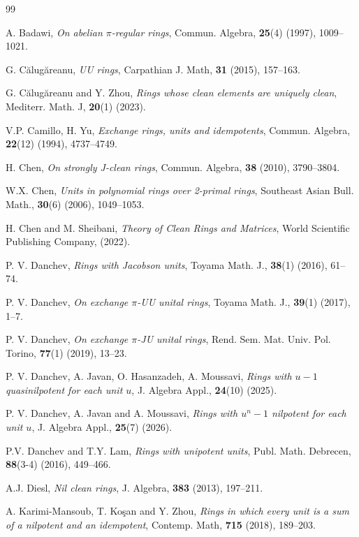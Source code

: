 \documentclass[12pt]{amsart}
\theoremstyle{definition}
\begin{document}
\begin{thebibliography}{99}
	
A. Badawi, {\it On abelian $\pi$-regular rings}, Commun. Algebra, {\bf 25}(4) (1997), 1009--1021.

G. Călugăreanu, {\it UU rings}, Carpathian J. Math, {\bf 31} (2015), 157--163.

G. Călugăreanu and Y. Zhou, {\it Rings whose clean elements are uniquely clean}, Mediterr. Math. J, {\bf 20}(1) (2023).

V.P. Camillo, H. Yu, {\it Exchange rings, units and idempotents}, Commun. Algebra, {\bf 22}(12) (1994), 4737--4749.

H. Chen, {\it On strongly J-clean rings}, Commun. Algebra, {\bf 38} (2010), 3790--3804.

W.X. Chen, {\it Units in polynomial rings over 2-primal rings}, Southeast Asian Bull. Math., {\bf 30}(6) (2006), 1049--1053.

H. Chen and M. Sheibani, {\it Theory of Clean Rings and Matrices}, World Scientific Publishing Company, (2022).

P. V. Danchev, {\it Rings with Jacobson units}, Toyama Math. J., {\bf 38}(1) (2016), 61--74.

P. V. Danchev, {\it On exchange $\pi$-UU unital rings}, Toyama Math. J., {\bf 39}(1) (2017), 1--7.

P. V. Danchev, {\it On exchange $\pi$-JU unital rings}, Rend. Sem. Mat. Univ. Pol. Torino, {\bf 77}(1) (2019), 13--23.

P. V. Danchev, A. Javan, O. Hasanzadeh, A. Moussavi, {\it Rings with $u-1$ quasinilpotent for each unit $u$}, J. Algebra Appl., {\bf 24}(10) (2025).

P. V. Danchev, A. Javan and A. Moussavi, {\it Rings with $u^n-1$ nilpotent for each unit $u$}, J. Algebra Appl., {\bf 25}(7) (2026).

P.V. Danchev and T.Y. Lam, {\it Rings with unipotent units}, Publ. Math. Debrecen, {\bf 88}(3-4) (2016), 449--466.

A.J. Diesl, {\it Nil clean rings}, J. Algebra, {\bf 383} (2013), 197--211.

A. Karimi-Mansoub, T. Ko\c{s}an and Y. Zhou, {\it Rings in which every unit is a sum of a nilpotent and an idempotent}, Contemp. Math, {\bf 715} (2018), 189--203.


\end{thebibliography}
\end{document}
